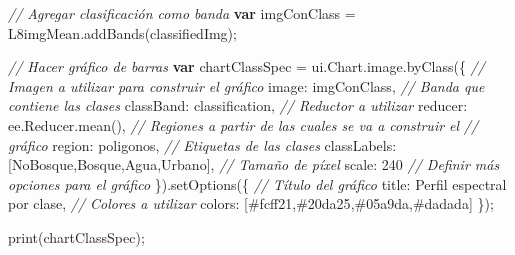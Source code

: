 \documentclass[
  12pt,
  letterpaper,
  twoside]{book}
\newenvironment{Shaded}{\begin{snugshade}}{\end{snugshade}}
\newcommand{\AttributeTok}[1]{\textcolor[rgb]{0.48,0.12,0.64}{#1}}
\newcommand{\CommentTok}[1]{\textcolor[rgb]{0.24,0.58,0.00}{\textit{#1}}}
\newcommand{\ControlFlowTok}[1]{\textcolor[rgb]{0.00,0.00,0.00}{\textbf{#1}}}
\newcommand{\DataTypeTok}[1]{\textcolor[rgb]{0.00,0.00,0.00}{#1}}
\newcommand{\DecValTok}[1]{\textcolor[rgb]{0.28,0.53,0.93}{#1}}
\newcommand{\FunctionTok}[1]{\textcolor[rgb]{0.48,0.12,0.64}{#1}}
\newcommand{\KeywordTok}[1]{\textcolor[rgb]{0.48,0.12,0.64}{#1}}
\newcommand{\NormalTok}[1]{#1}
\newcommand{\OperatorTok}[1]{\textcolor[rgb]{0.00,0.00,0.00}{#1}}
\newcommand{\StringTok}[1]{\textcolor[rgb]{0.87,0.29,0.22}{#1}}
\begin{document}
\begin{Shaded}
\begin{Highlighting}[]
\CommentTok{// Agregar clasificación como banda}
\ControlFlowTok{var}\NormalTok{ imgConClass }\OperatorTok{=}\NormalTok{ L8imgMean}\OperatorTok{.}\FunctionTok{addBands}\NormalTok{(classifiedImg)}\OperatorTok{;}

\CommentTok{// Hacer gráfico de barras}
\ControlFlowTok{var}\NormalTok{ chartClassSpec }\OperatorTok{=} \KeywordTok{ui}\OperatorTok{.}\AttributeTok{Chart}\OperatorTok{.}\AttributeTok{image}\OperatorTok{.}\FunctionTok{byClass}\NormalTok{(\{}
  \CommentTok{// Imagen a utilizar para construir el gráfico}
  \DataTypeTok{image}\OperatorTok{:}\NormalTok{ imgConClass}\OperatorTok{,}
  \CommentTok{// Banda que contiene las clases}
  \DataTypeTok{classBand}\OperatorTok{:} \StringTok{\textquotesingle{}classification\textquotesingle{}}\OperatorTok{,}
  \CommentTok{// Reductor a utilizar}
  \DataTypeTok{reducer}\OperatorTok{:} \KeywordTok{ee}\OperatorTok{.}\AttributeTok{Reducer}\OperatorTok{.}\FunctionTok{mean}\NormalTok{()}\OperatorTok{,}
  \CommentTok{// Regiones a partir de las cuales se va a construir el }
  \CommentTok{// gráfico}
  \DataTypeTok{region}\OperatorTok{:}\NormalTok{ poligonos}\OperatorTok{,}
  \CommentTok{// Etiquetas de las clases}
  \DataTypeTok{classLabels}\OperatorTok{:}\NormalTok{ [}\StringTok{\textquotesingle{}NoBosque\textquotesingle{}}\OperatorTok{,}\StringTok{\textquotesingle{}Bosque\textquotesingle{}}\OperatorTok{,}\StringTok{\textquotesingle{}Agua\textquotesingle{}}\OperatorTok{,}\StringTok{\textquotesingle{}Urbano\textquotesingle{}}\NormalTok{]}\OperatorTok{,}
  \CommentTok{// Tamaño de píxel}
  \DataTypeTok{scale}\OperatorTok{:} \DecValTok{240}
  \CommentTok{// Definir más opciones para el gráfico}
\NormalTok{\})}\OperatorTok{.}\FunctionTok{setOptions}\NormalTok{(\{}
  \CommentTok{// Título del gráfico}
  \DataTypeTok{title}\OperatorTok{:} \StringTok{\textquotesingle{}Perfil espectral por clase\textquotesingle{}}\OperatorTok{,}
  \CommentTok{// Colores a utilizar}
  \DataTypeTok{colors}\OperatorTok{:}\NormalTok{ [}\StringTok{\textquotesingle{}\#fcff21\textquotesingle{}}\OperatorTok{,}\StringTok{\textquotesingle{}\#20da25\textquotesingle{}}\OperatorTok{,}\StringTok{\textquotesingle{}\#05a9da\textquotesingle{}}\OperatorTok{,}\StringTok{\textquotesingle{}\#dadada\textquotesingle{}}\NormalTok{]}
\NormalTok{\})}\OperatorTok{;}

\FunctionTok{print}\NormalTok{(chartClassSpec)}\OperatorTok{;}
\end{Highlighting}
\end{Shaded}
\end{document}
